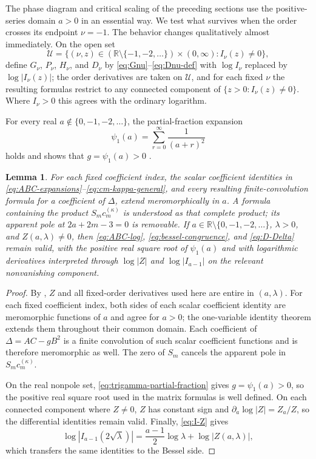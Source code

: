 \documentclass[11pt,a4paper]{amsart}
\numberwithin{equation}{section}
\theoremstyle{plain}
\newtheorem{lemma}[theorem]{Lemma}
\theoremstyle{definition}
\newcommand{\R}{\mathbb R}
\begin{document}
The phase diagram and critical scaling of the preceding sections use the
positive-series domain \(a>0\) in an essential way.  We test what survives when the order crosses its endpoint
\(\nu=-1\).  The behavior changes qualitatively almost immediately.  On the open set
\[
 \mathcal U=\bigl\{(\nu,z)\in
 (\R\setminus\{-1,-2,\ldots\})\times(0,\infty):I_\nu(z)\ne0\bigr\},
\]
define \(G_\nu\), \(P_\nu\), \(H_\nu\), and \(D_\nu\) by
\eqref{eq:Gnu}--\eqref{eq:Dnu-def} with \(\log I_\nu\) replaced by \(\log|I_\nu(z)|\);
the order derivatives are taken on \(\mathcal U\), and for each fixed \(\nu\) the
resulting formulas restrict to any connected component of
\(\{z>0:I_\nu(z)\ne0\}\).  Where \(I_\nu>0\) this agrees with the ordinary
logarithm.

For every real \(a\notin\{0,-1,-2,\ldots\}\), the partial-fraction expansion
\begin{equation}\label{eq:trigamma-partial-fraction}
 \psi_1(a)=\sum_{r=0}^{\infty}\frac1{(a+r)^2}
\end{equation}
holds and shows that \(g=\psi_1(a)>0\) \cite[eq.~5.15.1]{NISTDLMFGamma}.

\begin{lemma}\label{lem:coefficient-continuation}
For each fixed coefficient index, the scalar coefficient identities in
\eqref{eq:ABC-expansions}--\eqref{eq:cm-kappa-general}, and every resulting
finite-convolution formula for a coefficient of \(\Delta\), extend
meromorphically in \(a\).  A formula containing the product
\(S_mc_m^{(\kappa)}\) is understood as that complete product; its apparent pole
at \(2a+2m-3=0\) is removable.  If
\(a\in\R\setminus\{0,-1,-2,\ldots\}\), \(\lambda>0\), and
\(Z(a,\lambda)\ne0\), then \eqref{eq:ABC-log}, \eqref{eq:bessel-congruence},
and \eqref{eq:D-Delta} remain valid, with the positive real square root of
\(\psi_1(a)\) and with logarithmic derivatives interpreted through
\(\log|Z|\) and \(\log|I_{a-1}|\) on the relevant nonvanishing component.
\end{lemma}

\begin{proof}
By , \(Z\) and all fixed-order derivatives used here are
entire in \((a,\lambda)\).  For each fixed coefficient index, both sides of
each scalar coefficient identity are meromorphic functions of \(a\) and agree
for \(a>0\); the one-variable identity theorem extends them throughout their
common domain.  Each coefficient of \(\Delta=AC-gB^2\) is a finite convolution
of such scalar coefficient functions and is therefore meromorphic as well.
The zero of \(S_m\) cancels the apparent pole in
\(S_mc_m^{(\kappa)}\).

On the real nonpole set, \eqref{eq:trigamma-partial-fraction} gives
\(g=\psi_1(a)>0\), so the positive real square root used in the matrix
formulas is well defined.  On each connected component where \(Z\ne0\), \(Z\) has
constant sign and \(\partial_a\log|Z|=Z_a/Z\), so the differential identities
remain valid.  Finally, \eqref{eq:I-Z} gives
\[
 \log|I_{a-1}(2\sqrt\lambda)|
 =\frac{a-1}{2}\log\lambda+\log|Z(a,\lambda)|,
\]
which transfers the same identities to the Bessel side.
\end{proof}
\end{document}

